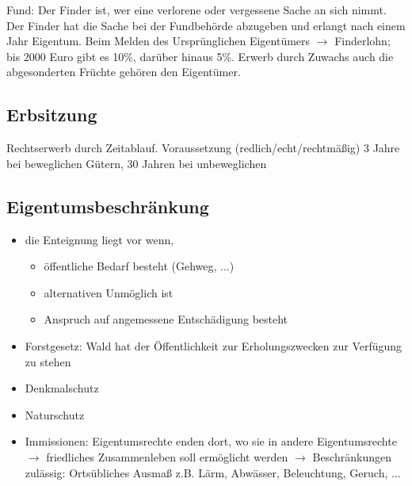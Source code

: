 \documentclass[a4paper]{report}
\begin{document}
Fund: Der Finder ist, wer eine verlorene oder vergessene Sache an sich nimmt. Der Finder hat die Sache bei der Fundbehörde abzugeben und erlangt nach einem Jahr Eigentum.
\newline
\newline
Beim Melden des Ursprünglichen Eigentümers $\rightarrow$ Finderlohn; bis 2000 Euro gibt es 10\%, darüber hinaus 5\%.
Erwerb durch Zuwachs auch die abgesonderten Früchte gehören den Eigentümer.

\subsection{Erbsitzung}

Rechtserwerb durch Zeitablauf. Voraussetzung (redlich/echt/rechtmäßig) 3 Jahre bei beweglichen Gütern, 30 Jahren bei unbeweglichen

\subsection{Eigentumsbeschränkung}

\begin{itemize}
\item die Enteignung liegt vor wenn,
\begin{itemize}
\item öffentliche Bedarf besteht (Gehweg, ...)
\item alternativen Unmöglich ist
\item Anspruch auf angemessene Entschädigung besteht
\end{itemize}
\item Forstgesetz: Wald hat der Öffentlichkeit zur Erholungszwecken zur Verfügung zu stehen
\item Denkmalschutz
\item Naturschutz
\item Immissionen: Eigentumsrechte enden dort, wo sie in andere Eigentumsrechte $\rightarrow$ friedliches Zusammenleben soll ermöglicht werden $\rightarrow$ Beschränkungen zulässig: Ortsübliches Ausmaß z.B. Lärm, Abwässer, Beleuchtung, Geruch, ...
\end{itemize}
\end{document}
